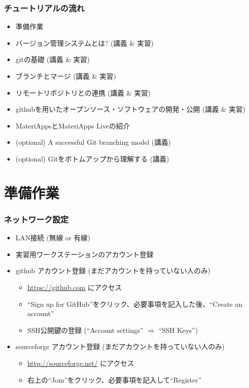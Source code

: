 \begin{frame}
  \frametitle{チュートリアルの流れ}
  \begin{itemize}
  \item 準備作業
  \item バージョン管理システムとは? (講義 \& 実習)
  \item gitの基礎 (講義 \& 実習)
  \item ブランチとマージ (講義 \& 実習)
  \item リモートリポジトリとの連携 (講義 \& 実習)
  \item githubを用いたオープンソース・ソフトウェアの開発・公開 (講義 \& 実習)
  \item MateriAppsとMateriApps Liveの紹介
  \item (optional) A successful Git branching model (講義)
  \item (optional) Gitをボトムアップから理解する (講義)
  \end{itemize}
\end{frame}

\section{準備作業}

\begin{frame}
  \frametitle{ネットワーク設定}
  \begin{itemize}
  \item LAN接続 (無線 or 有線)
  \item 実習用ワークステーションのアカウント登録
  \item github アカウント登録 (まだアカウントを持っていない人のみ)
    \begin{itemize}
    \item \url{https://github.com} にアクセス
    \item ``Sign up for GitHub''をクリック、必要事項を記入した後、``Create an account''
    \item SSH公開鍵の登録 (``Account settings'' $\Rightarrow$ ``SSH Keys'')
    \end{itemize} 
  \item sourceforge アカウント登録 (まだアカウントを持っていない人のみ)
    \begin{itemize}
    \item \url{http://sourceforge.net/} にアクセス
    \item 右上の``Join''をクリック、必要事項を記入して``Register''
    \end{itemize} 
  \end{itemize}
\end{frame}


